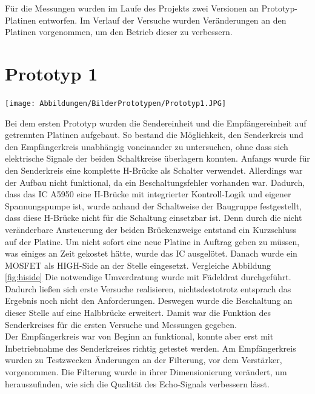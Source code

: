 Für die Messungen wurden im Laufe des Projekts zwei Versionen an Prototyp-Platinen entworfen. Im Verlauf der Versuche wurden Veränderungen an den Platinen vorgenommen, um den Betrieb dieser zu verbessern. 
\section{Prototyp 1}
\begin{center}
\begin{minipage}{0.75\textwidth}
\texttt{[image: Abbildungen/BilderPrototypen/Prototyp1.JPG]}
\label{fig:Prototyp1}
\end{minipage}
\end{center}
Bei dem ersten Prototyp wurden die Sendereinheit und die Empfängereinheit auf getrennten Platinen aufgebaut. So bestand die Möglichkeit, den Senderkreis und den Empfängerkreis unabhängig voneinander zu untersuchen, ohne dass sich elektrische Signale der beiden Schaltkreise überlagern konnten. Anfangs wurde für den Senderkreis eine komplette H-Brücke als Schalter verwendet. Allerdings war der Aufbau nicht funktional, da ein Beschaltungsfehler vorhanden war. Dadurch, dass das IC A5950 eine H-Brücke mit integrierter Kontroll-Logik und eigener Spannungspumpe ist, wurde anhand der Schaltweise der Baugruppe festgestellt, dass diese H-Brücke nicht für die Schaltung einsetzbar ist. Denn durch die nicht veränderbare Ansteuerung der beiden Brückenzweige entstand ein Kurzschluss auf der Platine. Um nicht sofort eine neue Platine in Auftrag geben zu müssen, was einiges an Zeit gekostet hätte, wurde das IC ausgelötet. Danach wurde ein MOSFET als HIGH-Side an der Stelle eingesetzt. Vergleiche Abbildung \ref{fig:hiside} Die notwendige Umverdratung wurde mit Fädeldrat durchgeführt. Dadurch ließen sich erste Versuche realisieren, nichtsdestotrotz entsprach das Ergebnis noch nicht den Anforderungen. Deswegen wurde die Beschaltung an dieser Stelle auf eine Halbbrücke erweitert. Damit war die Funktion des Senderkreises für die ersten Versuche und Messungen gegeben.\\
Der Empfängerkreis war von Beginn an funktional, konnte aber erst mit Inbetriebnahme des Senderkreises richtig getestet werden. Am Empfängerkreis wurden zu Testzwecken Änderungen an der Filterung, vor dem Verstärker, vorgenommen. Die Filterung wurde in ihrer Dimensionierung verändert, um herauszufinden, wie sich die Qualität des Echo-Signals verbessern lässt.\\

